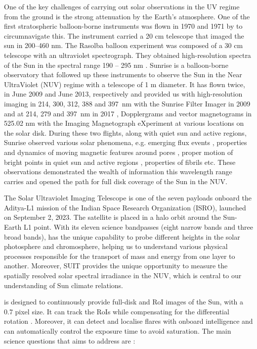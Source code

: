 One of the key challenges of carrying out solar observations in the UV regime from the ground is the strong attenuation by the Earth's atmosphere. One of the first stratospheric balloon-borne instruments was flown in 1970 and 1971 by \cite{herse79} to circumnavigate this. The instrument carried a 20 cm telescope that imaged the sun in 200{--}460 nm. The Rasolba balloon experiment was composed of a 30 cm telescope with an ultraviolet spectrograph. They obtained high-resolution spectra of the Sun in the spectral range 190 {--} 295 nm \citep{samain85,staath95}. Sunrise \citep{sunrise1,sunrise2} is a balloon-borne observatory that followed up these instruments to observe the Sun in the Near UltraViolet (NUV) regime with a telescope of 1 m diameter. It has flown twice, in June 2009 and June 2013, respectively and provided us with high-resolution imaging in 214, 300, 312, 388 and 397~nm with the Sunrise Filter Imager \citep[SuFI,][]{sufi} in 2009 and at 214, 279 and 397~nm in 2017 \citep{sunrise2}, Dopplergrams and vector magnetograms in  525.02 nm with the Imaging Magnetograph eXperiment \citep[IMaX,][]{imax} at various locations on the solar disk.  During these two flights, along with quiet sun and active regions, Sunrise observed various solar phenomena, e.g. emerging flux events \citep{centeno17}, properties and dynamics of moving magnetic features around pores \citep{kaithakkal17}, proper motion of bright points in quiet sun and active regions \citep{jafarzadeh17}, properties of fibrils \citep{gaferia17} etc. These observations demonstrated the wealth of information this wavelength range carries and opened the path for full disk coverage of the Sun in the NUV.

The Solar Ultraviolet Imaging Telescope \citep[SUIT;][]{ghosh16,article} is one of the seven payloads onboard the Aditya-L1 mission \citep{adityal1, aditya} of the Indian Space Research Organization (ISRO), launched on September 2, 2023. The satellite is placed in a halo orbit around the Sun-Earth L1 point. With its eleven science bandpasses (eight narrow bands and three broad bands), {\suit} has the unique capability to probe different heights in the solar photosphere and chromosphere, helping us to understand various physical processes responsible for the transport of mass and energy from one layer to another. Moreover, SUIT provides the unique opportunity to measure the spatially resolved solar spectral irradiance in the NUV, which is central to our understanding of Sun climate relations. 

{\suit} is designed to continuously provide full-disk and RoI images of the Sun, with a 0.7{\arcsec} pixel size. It can track the RoIs while compensating for the differential rotation \citep{suit_algo}. Moreover, it can detect and localise flares with onboard intelligence and can automatically control the exposure time to avoid saturation. The main science questions that {\suit} aims to address are \citep[][]{suit_science,suit_main}: 

